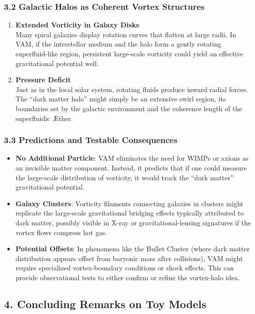 \subsubsection*{3.2 Galactic Halos as Coherent Vortex Structures}
\begin{enumerate}
    \item \textbf{Extended Vorticity in Galaxy Disks} \\
    Many spiral galaxies display rotation curves that flatten at large radii. In VAM, if the interstellar medium and the halo form a gently rotating superfluid-like region, persistent large-scale vorticity could yield an effective gravitational potential well.
    \item \textbf{Pressure Deficit} \\
    Just as in the local solar system, rotating fluids produce inward radial forces. The “dark matter halo” might simply be an extensive swirl region, its boundaries set by the galactic environment and the coherence length of the superfluidic Æther.
\end{enumerate}

\subsubsection*{3.3 Predictions and Testable Consequences}
\begin{itemize}
    \item \textbf{No Additional Particle}: VAM eliminates the need for WIMPs or axions as an invisible matter component. Instead, it predicts that if one could measure the large-scale distribution of vorticity, it would track the “dark matter” gravitational potential.
    \item \textbf{Galaxy Clusters}: Vorticity filaments connecting galaxies in clusters might replicate the large-scale gravitational bridging effects typically attributed to dark matter, possibly visible in X-ray or gravitational-lensing signatures if the vortex flows compress hot gas.
    \item \textbf{Potential Offsets}: In phenomena like the Bullet Cluster (where dark matter distribution appears offset from baryonic mass after collisions), VAM might require specialized vortex-boundary conditions or shock effects. This can provide observational tests to either confirm or refine the vortex-halo idea.
\end{itemize}

\subsection*{4. Concluding Remarks on Toy Models}


